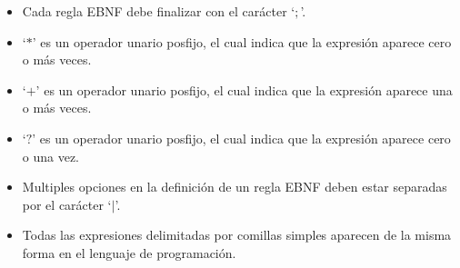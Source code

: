 \begin{itemize}
\item Cada regla EBNF debe finalizar con el car\'acter `$;$'. 
\item `$*$' es un operador unario posfijo, el cual indica que la expresi\'on aparece cero o m\'as veces. 
\item `$+$' es un operador unario posfijo, el cual indica que la expresi\'on aparece una o m\'as veces.
\item `$?$' es un operador unario posfijo, el cual indica que la expresi\'on aparece cero o una vez.
\item Multiples opciones en la definici\'on de un regla EBNF deben estar separadas por el car\'acter `$|$'.
\item Todas las expresiones delimitadas por comillas simples aparecen de la misma forma en el lenguaje de programaci\'on.
\end{itemize}

